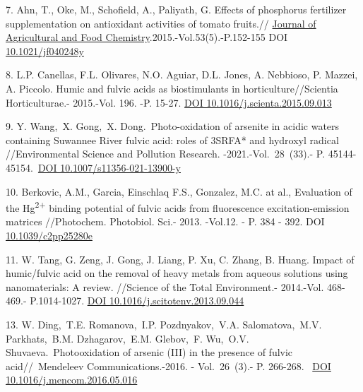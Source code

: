 \begin{references}
7. Ahn, T., Oke, M., Schofield, A., Paliyath, G. Effects of phosphorus
fertilizer supplementation on antioxidant activities of tomato fruits.//
\href{https://pubs.acs.org/journal/jafcau?ref=breadcrumb}{Journal of
Agricultural and Food Chemistry}.2015.-Vol.53(5).-P.152-155 DOI
\href{https://doi.org/10.1021/jf040248y}{10.1021/jf040248y}

8. L.P. Canellas, F.L. Olivares, N.O. Aguiar, D.L. Jones, A. Nebbioso,
P. Mazzei, A. Piccolo. Humic and fulvic acids as biostimulants in
horticulture//Scientia Horticulturae.- 2015.-Vol. 196. -P. 15-27.
\href{https://doi.org/10.1016/j.scienta.2015.09.013}{DOI
10.1016/j.scienta.2015.09.013}

9. Y. Wang,~X. Gong,~X. Dong.~Photo-oxidation of arsenite in acidic
waters containing Suwannee River fulvic acid: roles of 3SRFA* and
hydroxyl radical //Environmental Science and Pollution Research.
-2021.-Vol.~28~(33).- P.
45144-45154.~\href{https://doi.org/10.1007/s11356-021-13900-y}{DOI
10.1007/s11356-021-13900-y}

10. Berkovic, A.M., Garcia, Einschlaq F.S., Gonzalez, M.C. at al.,
Evaluation of the Hg\textsuperscript{2+} binding potential of fulvic
acids from fluorescence excitation-emission matrices //Photochem.
Photobiol. Sci.- 2013. -Vol.12. - P. 384 - 392. DOI
\href{https://doi.org/10.1039/c2pp25280e}{10.1039/c2pp25280e}

11. W. Tang, G. Zeng, J. Gong, J. Liang, P. Xu, C. Zhang, B. Huang.
Impact of humic/fulvic acid on the removal of heavy metals from aqueous
solutions using nanomaterials: A review. //Science of the Total
Environment.- 2014.-Vol. 468-469.- P.1014-1027.
\href{https://doi.org/10.1016/j.scitotenv.2013.09.044}{DOI
10.1016/j.scitotenv.2013.09.044}

13. W. Ding,~T.E. Romanova,~I.P. Pozdnyakov,~V.A. Salomatova,~M.V.
Parkhats,~B.M. Dzhagarov,~E.M. Glebov,~F. Wu,~O.V.
Shuvaeva.~Photooxidation of arsenic (III) in the presence of fulvic
acid//~Mendeleev Communications.-2016. - Vol.~26~(3).- P. 266-268.~
\href{https://doi.org/10.1016/j.mencom.2016.05.016}{DOI
10.1016/j.mencom.2016.05.016}
\end{references}


